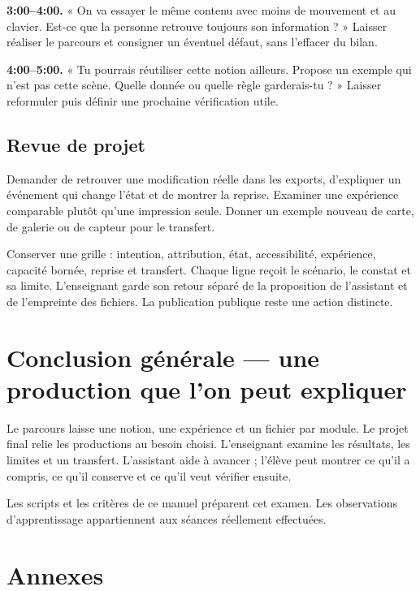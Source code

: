 \documentclass[
  canadien,
  11pt,
  a4paper,
]{report}
\begin{document}
\textbf{3:00--4:00.} « On va essayer le même contenu avec moins de
mouvement et au clavier. Est-ce que la personne retrouve toujours son
information ? » Laisser réaliser le parcours et consigner un éventuel
défaut, sans l'effacer du bilan.

\textbf{4:00--5:00.} « Tu pourrais réutiliser cette notion ailleurs.
Propose un exemple qui n'est pas cette scène. Quelle donnée ou quelle
règle garderais-tu ? » Laisser reformuler puis définir une prochaine
vérification utile.

\section{Revue de projet}\label{revue-de-projet}

Demander de retrouver une modification réelle dans les exports,
d'expliquer un événement qui change l'état et de montrer la reprise.
Examiner une expérience comparable plutôt qu'une impression seule.
Donner un exemple nouveau de carte, de galerie ou de capteur pour le
transfert.

Conserver une grille : intention, attribution, état, accessibilité,
expérience, capacité bornée, reprise et transfert. Chaque ligne reçoit
le scénario, le constat et sa limite. L'enseignant garde son retour
séparé de la proposition de l'assistant et de l'empreinte des fichiers.
La publication publique reste une action distincte.

\chapter{Conclusion générale --- une production que l'on peut
expliquer}\label{conclusion-guxe9nuxe9rale-une-production-que-lon-peut-expliquer}

Le parcours laisse une notion, une expérience et un fichier par module.
Le projet final relie les productions au besoin choisi. L'enseignant
examine les résultats, les limites et un transfert. L'assistant aide à
avancer ; l'élève peut montrer ce qu'il a compris, ce qu'il conserve et
ce qu'il veut vérifier ensuite.

Les scripts et les critères de ce manuel préparent cet examen. Les
observations d'apprentissage appartiennent aux séances réellement
effectuées.

\chapter{Annexes}\label{annexes}
\end{document}
